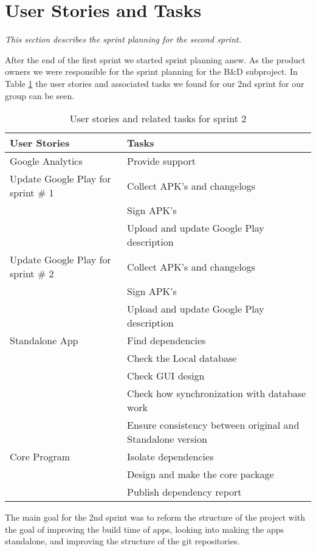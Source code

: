 \section{User Stories and Tasks} \label{Sprint2_SecUserStoriesAndTasks}
\textit{This section describes the sprint planning for the second sprint.}

After the end of the first sprint we started sprint planning anew. As the product owners we were responsible for the sprint planning for the B\&D subproject. In Table \ref{Sprint2_UserStories2_table} the user stories and associated tasks we found for our 2nd sprint for our group can be seen.

\begin{table}[H]
	\centering
	\begin{tabular}{ll}
		\textbf{User Stories} & \textbf{Tasks}\\ \hline \noalign{\vskip 2mm}
		Google Analytics & Provide support\\ \hline
		Update Google Play for sprint \# 1 & Collect APK's and changelogs\\
		& Sign APK's\\
		& Upload and update Google Play description\\ \hline
		Update Google Play for sprint \# 2 & Collect APK's and changelogs\\
		& Sign APK's\\ 
		& Upload and update Google Play description\\ \hline
		Standalone App & Find dependencies\\
		& Check the Local database\\
		& Check GUI design\\
		& Check how synchronization with database work\\
		& Ensure consistency between original and Standalone version\\ \hline
		Core Program & Isolate dependencies\\
		& Design and make the core package\\
		& Publish dependency report\\ \hline
	\end{tabular}
	\caption{User stories and related tasks for sprint 2}
	\label{Sprint2_UserStories2_table}
\end{table}

The main goal for the 2nd sprint was to reform the structure of the project with the goal of improving the build time of apps, looking into making the apps standalone, and improving the structure of the git repositories.
\newpage